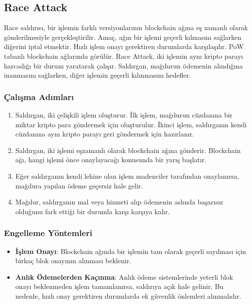 \newpage

\subsection{Race Attack}

Race saldırısı, bir işlemin farklı versiyonlarının blockchain ağına eş zamanlı olarak gönderilmesiyle gerçekleştirilir. Amaç, ağın bir işlemi geçerli kılmasını sağlarken diğerini iptal etmektir. Hızlı işlem onayı gerektiren durumlarda karşılaşılır. PoW tabanlı blockchain ağlarında görülür. Race Attack, iki işlemin aynı kripto parayı harcadığı bir durum yaratarak çalışır. Saldırgan, mağdurun ödemenin alındığına inanmasını sağlarken, diğer işlemin geçerli kılınmasını hedefler.

\subsubsection{Çalışma Adımları}

\begin{enumerate}
    \item Saldırgan, iki çelişkili işlem oluşturur. İlk işlem, mağdurun cüzdanına bir miktar kripto para göndermek için oluşturulur. İkinci işlem, saldırganın kendi cüzdanına aynı kripto parayı geri göndermek için hazırlanır.
    \item Saldırgan, iki işlemi eşzamanlı olarak blockchain ağına gönderir. Blockchain ağı, hangi işlemi önce onaylayacağı konusunda bir yarış başlatır.
    \item Eğer saldırganın kendi lehine olan işlem madenciler tarafından onaylanırsa, mağdura yapılan ödeme geçersiz hale gelir.
    \item Mağdur, saldırganın mal veya hizmeti alıp ödemenin aslında başarısız olduğunu fark ettiği bir durumla karşı karşıya kalır.
\end{enumerate}

\subsubsection{Engelleme Yöntemleri}

\begin{itemize}
    \item \textbf{İşlem Onayı}: Blockchain ağında bir işlemin tam olarak geçerli sayılması için birkaç blok onayının alınması beklenir.
    \item \textbf{Anlık Ödemelerden Kaçınma}: Anlık ödeme sistemlerinde yeterli blok onayı beklenmeden işlem tamamlanırsa, saldırıya açık hale gelinir. Bu nedenle, hızlı onay gerektiren durumlarda ek güvenlik önlemleri alınmalıdır.
\end{itemize}

